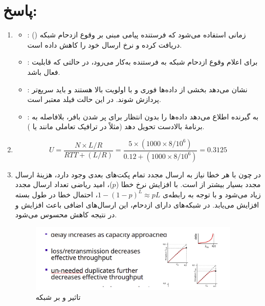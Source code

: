 \section*{پاسخ:}

\begin{enumerate}[label=\alph*)]

\item 
\begin{itemize}
    \item {}: زمانی استفاده می‌شود که فرستنده پیامی مبنی بر وقوع ازدحام شبکه () دریافت کرده و نرخ ارسال خود را کاهش داده است.
    \item {}: برای اعلام وقوع ازدحام شبکه به فرستنده به‌کار می‌رود، در حالتی که قابلیت  فعال باشد.
    \item {}: نشان می‌دهد بخشی از داده‌ها فوری و با اولویت بالا هستند و باید سریع‌تر پردازش شوند. در این حالت فیلد  معتبر است.
    \item {}: به گیرنده اطلاع می‌دهد داده‌ها را بدون انتظار برای پر شدن بافر، بلافاصله به برنامهٔ بالادست تحویل دهد (مثلاً در ترافیک تعاملی مانند  یا ).
\end{itemize}

\item 
\[
U = \frac{N \times L/R}{RTT + (L/R)} = \frac{5 \times (1000 \times 8 / 10^6)}{0.12 + (1000 \times 8 / 10^6)} = 0.3125
\]

\item 
در  چون با هر خطا نیاز به ارسال مجدد تمام پکت‌های بعدی وجود دارد، هزینهٔ ارسال مجدد بسیار بیشتر از  است.  
با افزایش نرخ خطا (\(p\))، امید ریاضی تعداد ارسال مجدد زیاد می‌شود و با توجه به رابطه‌ی \(1 - (1-p)^L \approx pL\)، احتمال خطا در طول بسته افزایش می‌یابد.  
در شبکه‌های دارای ازدحام، این ارسال‌های اضافی باعث افزایش  و در نتیجه کاهش محسوس  می‌شود.

\begin{figure}[H]
    \centering
    \includegraphics[width=0.95\textwidth]{Solutions/pics/Q2_3_solution.png}
    \caption{تاثیر  و  بر شبکه}
    \label{fig:small-example}
\end{figure}



\end{enumerate}
